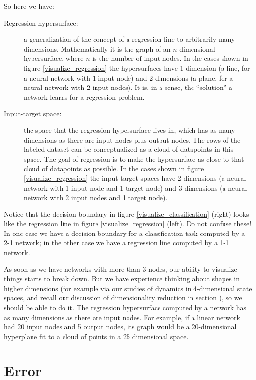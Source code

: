 So here we have:
\begin{description}
\item[Regression hypersurface:] a generalization of the concept of a regression line to arbitrarily many dimensions. Mathematically it is the graph of an $n$-dimensional hypersurface, where $n$ is the number of input nodes. In the cases shown in figure \ref{visualize_regression} the hypersurfaces have 1 dimension (a line, for a neural network with 1 input node) and 2 dimensions (a plane, for a neural network with 2 input nodes). It is, in a sense, the ``solution'' a network learns for a regression problem. 
\item[Input-target space:] the space that the regression hypersurface lives in, which has as many dimensions as there are input nodes plus output nodes. The rows of the labeled dataset can be conceptualized as a cloud of datapoints in this space. The goal of regression is to make the hypersurface as close to that cloud of datapoints as possible. In the cases shown in figure \ref{visualize_regression} the input-target spaces have 2 dimensions (a neural network with 1 input node and 1 target node) and 3 dimensions (a neural network with 2 input nodes and 1 target node).
\end{description}

Notice that the decision boundary in figure \ref{visualize_classification} (right) looks like the regression line in figure \ref{visualize_regression} (left). Do not confuse these! In one case we have a decision boundary for a classification task computed by a 2-1 network; in the other case we have a regression line computed by a 1-1 network.

As soon as we have networks with more than 3 nodes, our ability to visualize things starts to break down. But we have experience thinking about shapes in higher dimensions (for example via our studies of dynamics in 4-dimensional state spaces, and recall our discussion of dimensionality reduction in section ), so we should be able to do it. The regression hypersurface computed by a network has as many dimensions as there are input nodes. For example, if a linear network had 20 input nodes and 5 output nodes, its graph would be a 20-dimensional hyperplane fit to a cloud of points in a 25 dimensional space.


\section{Error}\label{sect_error}

